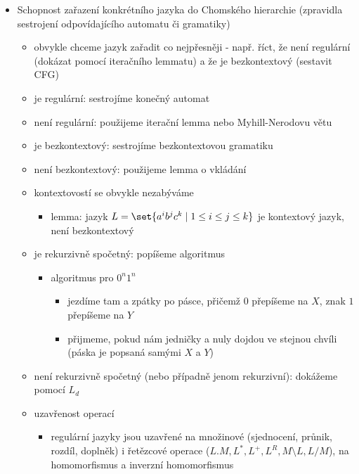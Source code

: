 \begin{itemize}
\begin{itemize}
\begin{itemize}
\item idea
\begin{itemize}
\item každý neterminál odpovídá stavu konečného automatu
\item pravidla odpovídají přechodové funkci
\end{itemize}
\item regulární jazyk je rozpoznatelná konečným automatem
\end{itemize}
\end{itemize}
\item Schopnost zařazení konkrétního jazyka do Chomského hierarchie (zpravidla sestrojení odpovídajícího automatu či gramatiky)
\begin{itemize}
\item obvykle chceme jazyk zařadit co nejpřesněji - např. říct, že není regulární (dokázat pomocí iteračního lemmatu) a že je bezkontextový (sestavit CFG)
\item je regulární: sestrojíme konečný automat
\item není regulární: použijeme iterační lemma nebo Myhill-Nerodovu větu
\item je bezkontextový: sestrojíme bezkontextovou gramatiku
\item není bezkontextový: použijeme lemma o vkládání
\item kontextovostí se obvykle nezabýváme
\begin{itemize}
\item lemma: jazyk $L=\set{a^ib^jc^k\mid1\leq i\leq j\leq k}$ je kontextový jazyk, není bezkontextový
\end{itemize}
\item je rekurzivně spočetný: popíšeme algoritmus
\begin{itemize}
\item algoritmus pro $0^n1^n$
\begin{itemize}
\item jezdíme tam a zpátky po pásce, přičemž $0$ přepíšeme na $X$, znak $1$ přepíšeme na $Y$
\item přijmeme, pokud nám jedničky a nuly dojdou ve stejnou chvíli (páska je popsaná samými $X$ a $Y$)
\end{itemize}
\end{itemize}
\item není rekurzivně spočetný (nebo případně jenom rekurzivní): dokážeme pomocí $L_d$
\item uzavřenost operací
\begin{itemize}
\item regulární jazyky jsou uzavřené na množinové (sjednocení, průnik, rozdíl, doplněk) i řetězcové operace ($L{.}M,L^*,L^+,L^R,M\setminus L,L/M$), na homomorfismus a inverzní homomorfismus

\end{itemize}
\end{itemize}
\end{itemize}
